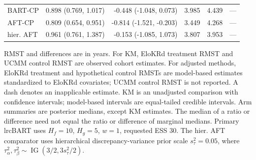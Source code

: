 \documentclass[11pt]{article}
\theoremstyle{remark}\newtheorem{remark}{Remark}[section]
\begin{document}
\begin{landscape}
\begin{longtable}{lrrrrr}
BART-CP & 0.898 (0.769, 1.017) & -0.448 (-1.048, 0.073) & 3.985 & 4.439 & --- \\
AFT-CP & 0.809 (0.654, 0.951) & -0.814 (-1.521, -0.203) & 3.449 & 4.268 & --- \\
hier. AFT & 0.961 (0.761, 1.387) & -0.153 (-1.085, 1.073) & 3.807 & 3.953 & --- \\
\end{longtable}
\noindent\begin{minipage}{\linewidth}\footnotesize RMST and differences are in years. For KM, EloKRd treatment RMST and UCMM control RMST are observed cohort estimates. For adjusted methods, EloKRd treatment and hypothetical control RMSTs are model-based estimates standardized to EloKRd covariates; UCMM control RMST is not reported. A dash denotes an inapplicable estimate. KM is an unadjusted comparison with confidence intervals; model-based intervals are equal-tailed credible intervals. Arm summaries are posterior medians, except KM estimates. The median of a ratio or difference need not equal the ratio or difference of marginal medians. Primary lrcBART uses $H_f=10$, $H_g=5$, $w=1$, requested ESS 30. The hier. AFT comparator uses hierarchical discrepancy-variance prior scale $s_\tau^2=0.05$, where $\tau_\alpha^2,\tau_\beta^2\sim\operatorname{IG}(3/2,3s_\tau^2/2)$.\end{minipage}
\endgroup
\end{landscape}
 \clearpage
\begingroup
\setlength{\tabcolsep}{4pt}
\renewcommand{\arraystretch}{1.0}
\fontsize{9.5}{11}\selectfont
\end{document}

